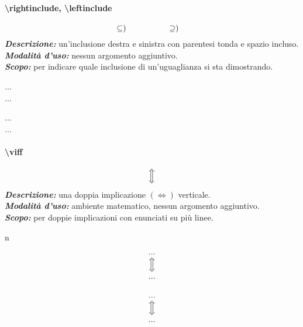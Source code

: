 \paragraph{\textbackslash rightinclude, \textbackslash leftinclude}
\begin{equation*}
	\subseteq)\quad\qquad\qquad\supseteq)\quad
\end{equation*}
\textbf{\textit{Descrizione:}} un'inclusione destra e sinistra con parentesi tonda e spazio incluso.\\
\textbf{\textit{Modalità d'uso:}} nessun argomento aggiuntivo.\\
\textbf{\textit{Scopo:}} per indicare quale inclusione di un'uguaglianza si sta dimostrando.
\begin{example}{}
	\rightinclude ...\\
	\leftinclude ...
\end{example}
\begin{codelatex}
\rightinclude ...\\
\leftinclude ...
\end{codelatex}
\paragraph{\textbackslash viff}
\begin{equation*}
	\Big\Updownarrow
\end{equation*}
\textbf{\textit{Descrizione:}} una doppia implicazione  $(\iff)$ verticale.\\
\textbf{\textit{Modalità d'uso:}} ambiente matematico, nessun argomento aggiuntivo.\\
\textbf{\textit{Scopo:}} per doppie implicazioni con enunciati su più linee.
\begin{example}{n}
	\begin{equation*}
		\begin{array}{c}
			...\\
			\Big\Updownarrow\\
			...
		\end{array}
	\end{equation*}
\end{example}
\begin{codelatex}
\begin{equation*}
	\begin{array}{c}
		...\\
		\Big\Updownarrow\\
		...
	\end{array}
\end{equation*}
\end{codelatex}
